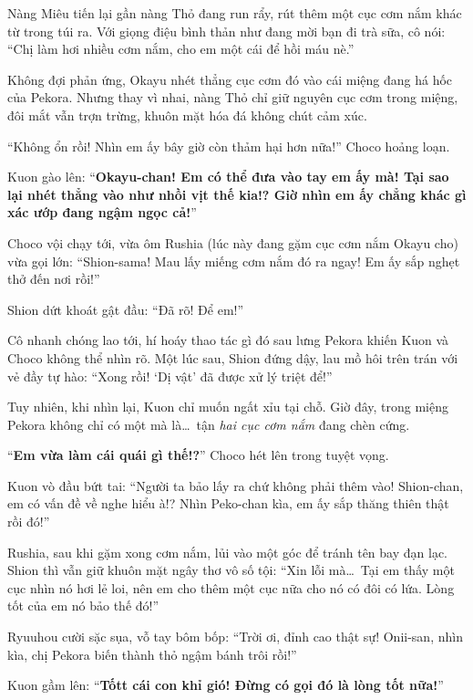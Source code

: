 \documentclass[../main.tex]{subfiles}
\begin{document}
Nàng Miêu tiến lại gần nàng Thỏ đang run rẩy, rút thêm một cục cơm nắm khác từ trong túi ra. Với giọng điệu bình thản như đang mời bạn đi trà sữa, cô nói: ``Chị làm hơi nhiều cơm nắm, cho em một cái để hồi máu nè.''

Không đợi phản ứng, Okayu nhét thẳng cục cơm đó vào cái miệng đang há hốc của Pekora. Nhưng thay vì nhai, nàng Thỏ chỉ giữ nguyên cục cơm trong miệng, đôi mắt vẫn trợn trừng, khuôn mặt hóa đá không chút cảm xúc.


``Không ổn rồi! Nhìn em ấy bây giờ còn thảm hại hơn nữa!'' Choco hoảng loạn.

Kuon gào lên: ``\textbf{Okayu-chan! Em có thể đưa vào tay em ấy mà! Tại sao lại nhét thẳng vào như nhồi vịt thế kia!? Giờ nhìn em ấy chẳng khác gì xác ướp đang ngậm ngọc cả!}''

Choco vội chạy tới, vừa ôm Rushia (lúc này đang gặm cục cơm nắm Okayu cho) vừa gọi lớn: ``Shion-sama! Mau lấy miếng cơm nắm đó ra ngay! Em ấy sắp nghẹt thở đến nơi rồi!''

Shion dứt khoát gật đầu: ``Đã rõ! Để em!''

Cô nhanh chóng lao tới, hí hoáy thao tác gì đó sau lưng Pekora khiến Kuon và Choco không thể nhìn rõ. Một lúc sau, Shion đứng dậy, lau mồ hôi trên trán với vẻ đầy tự hào: ``Xong rồi! `Dị vật' đã được xử lý triệt để!''

Tuy nhiên, khi nhìn lại, Kuon chỉ muốn ngất xỉu tại chỗ. Giờ đây, trong miệng Pekora không chỉ có một mà là\dots\ tận \emph{hai cục cơm nắm} đang chèn cứng.


``\textbf{Em vừa làm cái quái gì thế!?}'' Choco hét lên trong tuyệt vọng.

Kuon vò đầu bứt tai: ``Người ta bảo lấy ra chứ không phải thêm vào! Shion-chan, em có vấn đề về nghe hiểu à!? Nhìn Peko-chan kìa, em ấy sắp thăng thiên thật rồi đó!''


Rushia, sau khi gặm xong cơm nắm, lủi vào một góc để tránh tên bay đạn lạc. Shion thì vẫn giữ khuôn mặt ngây thơ vô số tội: ``Xin lỗi mà\dots\ Tại em thấy một cục nhìn nó hơi lẻ loi, nên em cho thêm một cục nữa cho nó có đôi có lứa. Lòng tốt của em nó bảo thế đó!''

Ryuuhou cười sặc sụa, vỗ tay bôm bốp: ``Trời ơi, đỉnh cao thật sự! Onii-san, nhìn kìa, chị Pekora biến thành thỏ ngậm bánh trôi rồi!''

Kuon gầm lên: ``\textbf{Tốtt cái con khỉ gió! Đừng có gọi đó là lòng tốt nữa!}''
\end{document}
